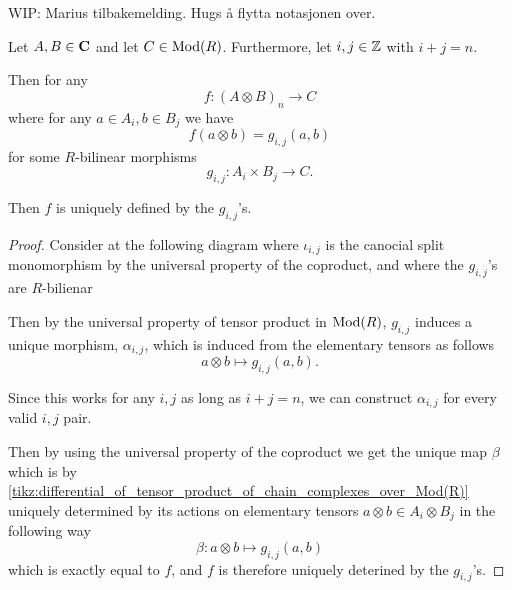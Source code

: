 WIP: Marius tilbakemelding. Hugs å flytta notasjonen over.

\begin{lemma}
    \label{lem:map_out_of_tensor_unique}
    Let \( A, B \in \operatorname{\mathbf{C}} \) and let \( C \in \operatorname{Mod}(R) \). Furthermore, let \( i, j \in {\mathbb{Z}} \) with \( i + j = n \).

    Then for any
    \[
        f: (A \otimes B)_n \to C
    \]
    where for any \( a \in A_i, b \in B_j \) we have
    \[
        f(a \otimes b) = g_{i, j}(a, b)
    \]
    for some \( R \)-bilinear morphisms
    \[
        g_{i, j}: A_i \times B_j \to C.
    \]

    Then \( f \) is uniquely defined by the \( g_{i, j} \)'s.
\end{lemma}
\begin{proof}
    Consider at the following diagram where \( \iota_{i, j} \) is the canocial split monomorphism by the universal property of the coproduct, and where the \( g_{i, j} \)'s are \( R \)-bilienar
    \begin{diagramlabel}[\label{tikz:differential_of_tensor_product_of_chain_complexes_over_Mod(R)}]
    \end{diagramlabel}

    Then by the universal property of tensor product in \( \operatorname{Mod}(R) \), \( g_{i, j} \) induces a unique morphism, \( \alpha_{i, j} \), which is induced from the elementary tensors as follows
    \[
        a \otimes b \mapsto g_{i, j}(a, b).
    \]

    Since this works for any \( i, j \) as long as \( i + j = n \), we can construct \( \alpha_{i, j} \) for every valid \( i, j \) pair.

    Then by using the universal property of the coproduct we get the unique map \( \beta \) which is by \autoref{tikz:differential_of_tensor_product_of_chain_complexes_over_Mod(R)} uniquely determined by its actions on elementary tensors \( a \otimes b \in A_i \otimes B_j \) in the following way
    \[
        \beta: a \otimes b \mapsto g_{i, j}(a, b)
    \]
    which is exactly equal to \( f \), and \( f \) is therefore uniquely deterined by the \( g_{i, j} \)'s.
\end{proof}

